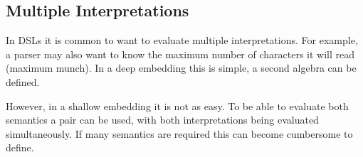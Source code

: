 \documentclass[a4paper, twocolumn, 10pt]{extarticle}
\makeatletter
\newcommand\codeskip{\mskip\codemuskip}%
\let\codefont\textsf
\newcommand{\Conid}[1]{\mathit{#1}}
\newcommand{\Varid}[1]{\mathit{#1}}
\newcommand{\anonymous}{\kern0.06em \vbox{\hrule\@width.5em}}
\def\resethooks{%
  \global\let\SaveRestoreHook\empty
  \global\let\ColumnHook\empty}
\newlength{\blanklineskip}
\let\hspre\empty
\let\hspost\empty
\renewcommand\Varid[1]{\codefont{#1}}
\let\Conid\Varid
\makeatother
\begin{document}
\subsection{Multiple Interpretations}

In DSLs it is common to want to evaluate multiple interpretations.
For example, a parser may also want to know the maximum number of characters it will read (maximum munch).
In a deep embedding this is simple, a second algebra can be defined.

\resethooks
However, in a shallow embedding it is not as easy.
To be able to evaluate both semantics a pair can be used, with both interpretations being evaluated simultaneously.
If many semantics are required this can become cumbersome to define.
\end{document}
